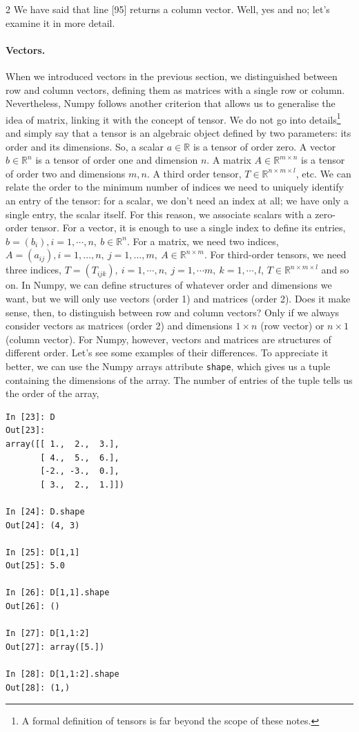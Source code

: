 \begin{paracol}{2}
We have said that line [95] returns a column vector. Well, yes and no; let's examine it in more detail.

\paragraph{Vectors.} When we introduced vectors in the previous section, we distinguished between row and column vectors, defining them as matrices with a single row or column. Nevertheless, Numpy follows another criterion that allows us to generalise the idea of matrix, linking it with the concept of tensor. We do not go into details\footnote{A formal definition of tensors is far beyond the scope of these notes.} and simply say that a tensor is an algebraic object defined by two parameters: its order and its dimensions. So, a scalar $a \in \mathbb{R}$ is a tensor of order zero. A vector $b \in \mathbb{R}^n$ is a tensor of order one and dimension $n$. A matrix $A\in \mathbb{R}^{m\times n}$ is a tensor of order two and dimensions $m,n$. A third order tensor, $T\in\mathbb{R}^{n\times m\times l}$, etc. We can relate the order to the minimum number of indices we need to uniquely identify an entry of the tensor: for a scalar, we don't need an index at all; we have only a single entry, the scalar itself. For this reason, we associate scalars with a zero-order tensor. For a vector, it is enough to use a single index to define its entries, $b=(b_i), i = 1,\cdots, n,\ b \in \mathbb{R}^n$. For a matrix, we need two indices, $A = (a_{ij}), i =1,\dots,n,\ j = 1,\dots,m,\ A \in \mathbb{R}^{n\times m}$. For third-order tensors, we need three indices, $T=(T_{ijk}),\ i =1,\cdots, n,\ j =1,\cdots m,\ k = 1,\cdots, l$, $T\in \mathbb{R}^{n\times m \times l}$ and so on. In Numpy, we can define structures of whatever order and dimensions we want, but we will only use vectors (order 1) and matrices (order 2). Does it make sense, then, to distinguish between row and column vectors? Only if we always consider vectors as matrices (order 2) and dimensions $1\times n$ (row vector) or $n\times 1$ (column vector). For Numpy, however, vectors and matrices are structures of different order. Let's see some examples of their differences. To appreciate it better, we can use the Numpy arrays attribute \texttt{shape}, which gives us a tuple containing the dimensions of the array. The number of entries of the tuple tells us the order of the array,     
\end{paracol}
\begin{center}
    \begin{minipage}{0.3\textwidth}
    \begin{verbatim}
In [23]: D
Out[23]: 
array([[ 1.,  2.,  3.],
       [ 4.,  5.,  6.],
       [-2., -3.,  0.],
       [ 3.,  2.,  1.]])

In [24]: D.shape
Out[24]: (4, 3)

In [25]: D[1,1]
Out[25]: 5.0

In [26]: D[1,1].shape
Out[26]: ()

In [27]: D[1,1:2]
Out[27]: array([5.])

In [28]: D[1,1:2].shape
Out[28]: (1,)
\end{verbatim}
\end{minipage}
\end{center}
